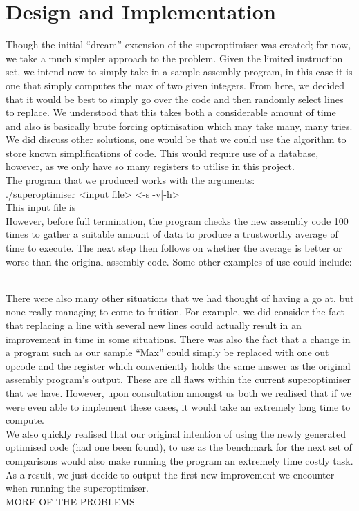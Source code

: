 \documentclass[11pt]{article}
\begin{document}
\section{Design and Implementation}
\indent Though the initial “dream” extension of the superoptimiser was created; for now, we take a much simpler approach to the problem. Given the limited instruction set, we intend now to simply take in a sample assembly program, in this case it is one that simply computes the max of two given integers. From here, we decided that it would be best to simply go over the code and then randomly select lines to replace. We understood that this takes both a considerable amount of time and also is basically brute forcing optimisation which may take many, many tries. We did discuss other solutions, one would be that we could use the algorithm to store known simplifications of code. This would require use of a database, however, as we only have so many registers to utilise in this project. 
\\
\indent The program that we produced works with the arguments:
\\ ./superoptimiser <input file> <-s|-v|-h>
\\ This input file is 
\\
\indent However, before full termination, the program checks the new assembly code 100 times to gather a suitable amount of data to produce a trustworthy average of time to execute. The next step then follows on whether the average is better or worse than the original assembly code.
Some other examples of use could include:

\\
\indent There were also many other situations that we had thought of having a go at, but none really managing to come to fruition. For example, we did consider the fact that replacing  a line with several new lines could actually result in an improvement in time in some situations. There was also the fact that a change in a program such as our sample “Max” could simply be replaced with one out opcode and the register which conveniently holds the same answer as the original assembly program's output. These are all flaws within the current superoptimiser that we have. However, upon consultation amongst us both we realised that if we were even able to implement these cases, it would take an extremely long time to compute.
\\
\indent We also quickly realised that our original intention of using the newly generated optimised code (had one been found), to use as the benchmark for the next set of comparisons would also make running the program an extremely time costly task. As a result, we just decide to output the first new improvement we encounter when running the superoptimiser. 
\\
MORE OF THE PROBLEMS
\end{document}

